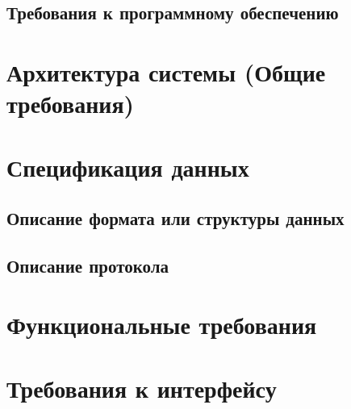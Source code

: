 \documentclass{fefu}
\begin{document}
  \subsection{Требования к программному обеспечению}
  

  \section{Архитектура системы (Общие требования)}
  

  \section{Спецификация данных}
  \subsection{Описание формата или структуры данных}
  
  \subsection{Описание протокола}
  

  \section{Функциональные требования}
  

  \section{Требования к интерфейсу}
  

  \newpage
  \nocite{*} %
  
  
\end{document}
